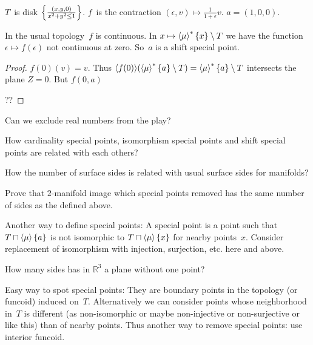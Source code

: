 \begin{example}
$T$~is disk $\left\{ \frac{(x,y,0)}{x^2+y^2\leq 1}\right\}$. $f$~is the contraction
$(\epsilon,v)\mapsto\frac{1}{1+\epsilon}v$. $a=(1,0,0)$.

In the usual topology~$f$ is continuous. In
$x\mapsto\left\langle \mu\right\rangle ^{\ast}\{x\}\setminus T$ we have the function
$\epsilon\mapsto f(\epsilon)$ not continuous at zero.
So~$a$ is a shift special point.
\end{example}

\begin{proof}
$f (0) (v) = v$. Thus $\langle f (0) \rangle (\left\langle \mu\right\rangle ^{\ast} \{ a
\} \setminus T) = \left\langle \mu\right\rangle ^{\ast} \{ a \} \setminus T$ intersects
the plane $Z = 0$. But $f (0, a)$

??
\end{proof}

\begin{question}
Can we exclude real numbers from the play?
\end{question}

\begin{question}
How cardinality special points, isomorphism special points and shift
special points are related with each others?
\end{question}

\begin{question}
How the number of surface sides is related with usual surface sides for
manifolds?
\end{question}

Prove that $2$-manifold image which special points removed has the same number
of sides as the defined above.

Another way to define special points: A special point is a point
such that $T\sqcap\left\langle \mu\right\rangle\{a\}$ is not isomorphic to
$T\sqcap\left\langle \mu\right\rangle\{x\}$ for nearby points~$x$. Consider replacement
of isomorphism with injection, surjection, etc. here and above.

How many sides has in $\mathbb{R}^3$ a plane without one point?

Easy way to spot special points: They are boundary points in the
topology (or funcoid) induced on~$T$. Alternatively we can consider
points whose neighborhood in~$T$ is different (as non-isomorphic or
maybe non-injective or non-surjective or like this) than of nearby
points. Thus another way to remove special points: use interior funcoid.
